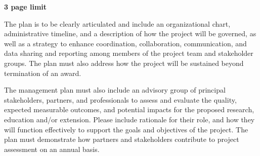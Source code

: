 \documentclass[12pt,letterpaper]{article}
\title{\ruleline{Management Plan}}
\begin{document}
\maketitle
\linenumbers

\textbf{3 page limit}

The plan is to be clearly articulated and include an organizational chart,
administrative timeline, and a description of how the project will be governed,
as well as a strategy to enhance coordination, collaboration, communication, and
data sharing and reporting among members of the project team and stakeholder
groups. The plan must also address how the project will be sustained beyond
termination of an award. 

The management plan must also include an advisory group of principal
stakeholders, partners, and professionals to assess and evaluate the quality,
expected measurable outcomes, and potential impacts for the proposed research,
education and/or extension. Please include rationale for their role, and how
they will function effectively to support the goals and objectives of the
project. The plan must demonstrate how partners and stakeholders contribute to
project assessment on an annual basis.
\end{document}

